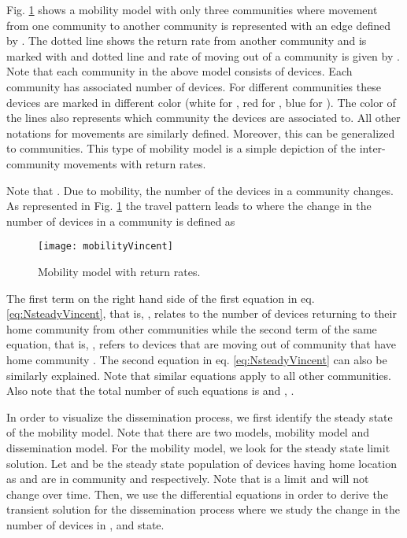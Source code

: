 \documentclass[review]{elsarticle}
\begin{document}
Fig. \ref{fig:mobilityVincent} shows a mobility model with only three communities where movement from one community  to another community  is represented with an edge defined by . The dotted line shows the return rate from another community and is marked with  and dotted line and rate of moving out of a community is given by . Note that each community  in the above model consists of devices. Each community has associated number of devices. For different communities these devices are marked in different color (white for , red for , blue for ). The color of the lines also represents which community the devices are associated to. All other notations for movements are similarly defined. Moreover, this can be generalized to  communities. This type of mobility model is a simple depiction of the inter-community movements with return rates.

Note that . Due to mobility, the number of the devices in a community  changes. As represented in Fig. \ref{fig:mobilityVincent} the travel pattern leads to \cite{Sattenspiel1995} where the change in the number of devices in a community is defined as
\begin{figure}\centering
    \texttt{[image: mobilityVincent]}
    \caption{Mobility model with return rates.}
    \label{fig:mobilityVincent}
\end{figure}


The first term on the right hand side of the first equation in eq. \ref{eq:NsteadyVincent}, that is, , relates to the number of devices returning to their home community  from other communities while the second term of the same equation, that is, , refers to devices that are moving out of community  that have home community . The second equation in eq. \ref{eq:NsteadyVincent} can also be similarly explained. Note that similar equations apply to all other communities. Also note that the total number of such equations is  and , .

In order to visualize the dissemination process, we first identify the steady state of the mobility model. Note that there are two models, mobility model and dissemination model. For the mobility model, we look for the steady state limit solution. Let  and  be the steady state population of devices having home location as  and are in community  and  respectively. Note that  is a limit and will not change over time. Then, we use the differential equations in order to derive the transient solution for the dissemination process where we study the change in the number of devices in ,  and  state.
\end{document}
